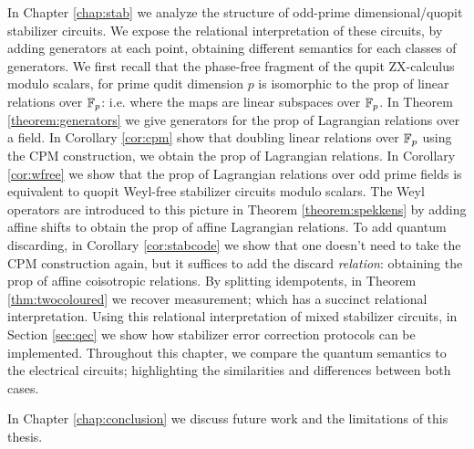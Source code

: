 In Chapter \ref{chap:stab}  we analyze the structure of odd-prime dimensional/quopit stabilizer circuits.
We expose the relational interpretation of these circuits, by adding generators at each point, obtaining different semantics for each classes of generators.  We first recall that the phase-free fragment of the qupit ZX-calculus modulo scalars, for prime qudit dimension $p$ is isomorphic to the prop of linear relations over $\mathbb{F}_p$: i.e. where the maps are linear subspaces over $\mathbb{F}_p$.
In Theorem \ref{theorem:generators} we give generators for the prop of Lagrangian relations over a field.
In Corollary \ref{cor:cpm} show that doubling  linear relations over $\mathbb{F}_p$ using the CPM construction, we obtain the prop of  Lagrangian relations. In Corollary \ref{cor:wfree} we  show that the prop of  Lagrangian relations over odd prime fields is equivalent to quopit Weyl-free stabilizer circuits modulo scalars. The Weyl operators are introduced to this picture in Theorem \ref{theorem:spekkens} by adding affine shifts to obtain the prop of affine Lagrangian relations. To add quantum discarding, in Corollary \ref{cor:stabcode} we show that one doesn't need to take the CPM construction again, but it suffices to add the discard {\em relation}:   obtaining the prop of affine coisotropic relations.  By splitting idempotents, in Theorem \ref{thm:twocoloured} we recover measurement; which has a succinct relational interpretation.  Using this relational interpretation of mixed stabilizer circuits, in Section \ref{sec:qec} we show how stabilizer error correction protocols can be implemented.  Throughout this chapter, we compare the quantum semantics to the electrical circuits; highlighting the similarities and differences between both cases.



In Chapter \ref{chap:conclusion} we discuss future work and the limitations of this thesis.



